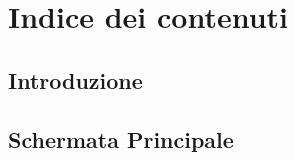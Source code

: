 
\chapter{Indice dei contenuti}
\label{ch:Contents}

\section{Introduzione}
\label{sec:ContentsIntro}


\section{Schermata Principale}
\label{sec:ContentsMain}


